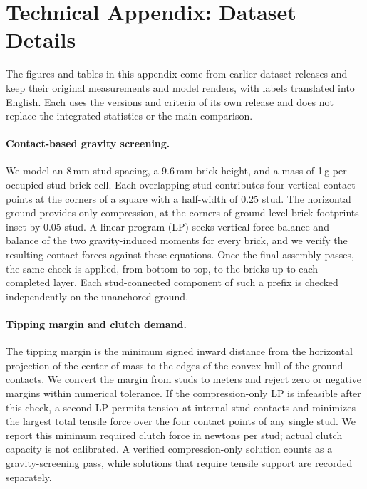 \section{Technical Appendix: Dataset Details}
\label{app:dataset}
The figures and tables in this appendix come from earlier dataset releases and keep their original measurements and model renders, with labels translated into English. Each uses the versions and criteria of its own release and does not replace the integrated statistics or the main comparison.

\paragraph{Contact-based gravity screening.}
We model an 8\,mm stud spacing, a 9.6\,mm brick height, and a mass of 1\,g per occupied stud-brick cell. Each overlapping stud contributes four vertical contact points at the corners of a square with a half-width of 0.25 stud. The horizontal ground provides only compression, at the corners of ground-level brick footprints inset by 0.05 stud. A linear program (LP) seeks vertical force balance and balance of the two gravity-induced moments for every brick, and we verify the resulting contact forces against these equations. Once the final assembly passes, the same check is applied, from bottom to top, to the bricks up to each completed layer. Each stud-connected component of such a prefix is checked independently on the unanchored ground.

\paragraph{Tipping margin and clutch demand.}
The tipping margin is the minimum signed inward distance from the horizontal projection of the center of mass to the edges of the convex hull of the ground contacts. We convert the margin from studs to meters and reject zero or negative margins within numerical tolerance. If the compression-only LP is infeasible after this check, a second LP permits tension at internal stud contacts and minimizes the largest total tensile force over the four contact points of any single stud. We report this minimum required clutch force in newtons per stud; actual clutch capacity is not calibrated. A verified compression-only solution counts as a gravity-screening pass, while solutions that require tensile support are recorded separately.

